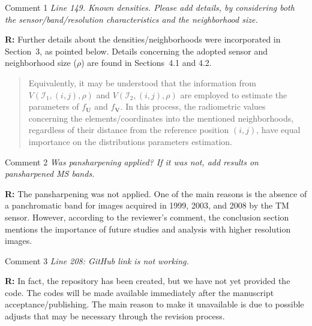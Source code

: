 \documentclass[11pt]{report}
\begin{document}
\medskip
\begin{mybox}{Comment 1}
\textit{Line 149. Known densities. Please add details, by considering both the sensor/band/resolution characteristics and the neighborhood size.}

\medskip

\textbf{R:} Further details about the densities/neighborhoods were incorporated in Section~3, as pointed below. Details concerning the adopted sensor and neighborhood size ($\rho$) are found in Sections~4.1 and 4.2.


\begin{quotation}
Equivalently, it may be understood that the information from $V(\mathcal{I}_1,(i,j),\rho)$ and $V(\mathcal{I}_2,(i,j),\rho)$ are employed to estimate the parameters of $f_{\mathbf{U}}$ and $f_{\mathbf{V}}$. 
In this process, the radiometric values concerning the elements/coordinates into the mentioned neighborhoods, regardless of their distance from the reference position $(i,j)$, have equal importance on the distributions parameters estimation.
\end{quotation}


\end{mybox}

\vspace{0.3cm}


\medskip
\begin{mybox}{Comment 2}
\textit{Was pansharpening applied? If it was not, add results on pansharpened MS bands.}

\medskip

\textbf{R:} The pansharpening was not applied. One of the main reasons is the absence of a panchromatic band for images acquired in 1999, 2003, and 2008 by the TM sensor. 
However, according to the reviewer's comment, the conclusion section mentions the importance of future studies and analysis with higher resolution images.



\end{mybox}

\vspace{0.3cm}




\medskip
\begin{mybox}{Comment 3}
\textit{Line 208: GitHub link is not working.}

\medskip
\textbf{R:} 
In fact, the repository has been created, but we have not yet provided the code. The codes will be made available immediately after the manuscript acceptance/publishing. The main reason to make it unavailable is due to possible adjusts that may be necessary through the revision process.

\end{mybox}
\end{document}
